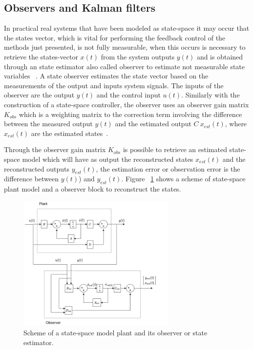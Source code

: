 \subsection{Observers and Kalman filters}

In practical real systems that have been modeled as state-space  it may occur that the states vector, which is vital for performing the feedback control of the methods just presented, is not fully measurable, when this occurs is necessary to retrieve the states-vector $x(t)$ from the  system outputs $y(t)$ and  is obtained through an state estimator also called observer to estimate not measurable state variables ~\cite[Chapter~8]{Chen1999}. A state observer estimates the state vector based on the measurements of the output  and inputs system signals. The inputs of the observer are the output $y(t)$ and the control input $u(t)$. Similarly with the construction of a state-space controller, the observer uses an observer gain matrix $K_{obs}$ which is a weighting matrix to the correction term involving the difference between the measured output $y(t)$ and the estimated output $C~x_{est}(t)$, where $x_{est}(t)$ are the estimated states~\cite[Chapter~10]{Ogata2009}. 
\smallskip

Through the observer gain matrix $K_{obs}$ is possible to retrieve an estimated state-space model which will have as output the reconstructed states $x_{est}(t)$ and the reconstructed outputs $y_{est}(t)$, the estimation error or observation error is the difference between $y(t)$) and $y_{est}(t)$. Figure ~\ref{plant_obser} shows a scheme of state-space plant model and a observer block to reconstruct the states. 
\smallskip

\begin{figure}[h]
	\centering
	\includegraphics[width=0.7\textwidth]{Chp2/plant_observer.png}
	\caption{ Scheme of a state-space model plant and its observer or state estimator. \label{plant_obser}}
\end{figure}

